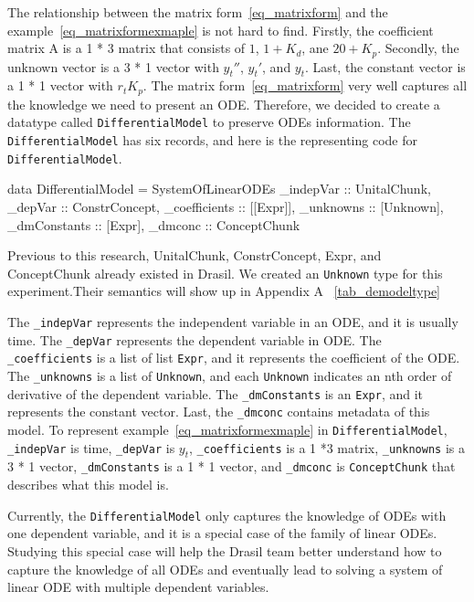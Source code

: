 The relationship between the matrix form~\ref{eq_matrixform} and the example~\ref{eq_matrixformexmaple} is not hard to find. Firstly, the coefficient matrix A is a 1 * 3 matrix that consists of $1$, $1 + K_d$, ane $20 + K_p$. Secondly, the unknown vector is a 3 * 1 vector with $y_t''$, $y_t'$, and $y_t$. Last, the constant vector is a 1 * 1 vector with $r_t K_p$. The matrix form~\ref{eq_matrixform} very well captures all the knowledge we need to present an ODE. Therefore, we decided to create a datatype called \verb|DifferentialModel| to preserve ODEs information. The \verb|DifferentialModel| has six records, and here is the representing code for \verb|DifferentialModel|.
\begin{haskell1}
data DifferentialModel = SystemOfLinearODEs {
	_indepVar :: UnitalChunk,
	_depVar :: ConstrConcept,
	_coefficients :: [[Expr]],
	_unknowns :: [Unknown],
	_dmConstants :: [Expr],
	_dmconc :: ConceptChunk
}
\end{haskell1}

Previous to this research, UnitalChunk, ConstrConcept, Expr, and ConceptChunk already existed in Drasil. We created an \verb|Unknown| type for this experiment.Their semantics will show up in Appendix A ~\ref{tab_demodeltype}

The \verb|_indepVar| represents the independent variable in an ODE, and it is usually time. The \verb|_depVar| represents the dependent variable in ODE. The \verb|_coefficients| is a list of list \verb|Expr|, and it represents the coefficient of the ODE. The \verb|_unknowns| is a list of \verb|Unknown|, and each \verb|Unknown| indicates an nth order of derivative of the dependent variable. The \verb|_dmConstants| is an \verb|Expr|, and it represents the constant vector. Last, the \verb|_dmconc| contains metadata of this model. To represent example~\ref{eq_matrixformexmaple} in \verb|DifferentialModel|, \verb|_indepVar| is time, \verb|_depVar| is $y_t$, \verb|_coefficients| is a 1 *3 matrix, \verb|_unknowns| is a 3 * 1 vector, \verb|_dmConstants| is a 1 * 1 vector, and \verb|_dmconc| is \verb|ConceptChunk| that describes what this model is.

Currently, the \verb|DifferentialModel| only captures the knowledge of ODEs with one dependent variable, and it is a special case of the family of linear ODEs. Studying this special case will help the Drasil team better understand how to capture the knowledge of all ODEs and eventually lead to solving a system of linear ODE with multiple dependent variables.


